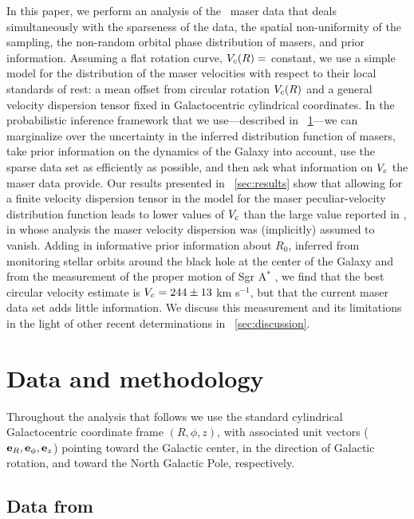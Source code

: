 In this paper, we perform an analysis of the \reid\ maser data that
deals simultaneously with the sparseness of the data, the spatial
non-uniformity of the sampling, the non-random orbital phase
distribution of masers, and prior information. Assuming a flat
rotation curve, $V_c(R) = $ constant, we use a simple model for the
distribution of the maser velocities with respect to their local
standards of rest: a mean offset from circular rotation $V_c(R)$ and a
general velocity dispersion tensor fixed in Galactocentric cylindrical
coordinates. In the probabilistic inference framework that we
use---described in \sectionname~\ref{sec:data}---we can marginalize
over the uncertainty in the inferred distribution function of masers,
take prior information on the dynamics of the Galaxy into account, use
the sparse data set as efficiently as possible, and then ask what
information on $V_c$ the maser data provide. Our results presented in
\sectionname~\ref{sec:results} show that allowing for a finite
velocity dispersion tensor in the model for the maser
peculiar-velocity distribution function leads to lower values of $V_c$
than the large value reported in \reid, in whose analysis the maser
velocity dispersion was (implicitly) assumed to vanish.  Adding in
informative prior information about $R_0$, inferred from monitoring
stellar orbits around the black hole at the center of the Galaxy
\citep{Ghez08a,Gillessen09a} and from the measurement of the proper
motion of Sgr A$^*$ \citep{Reid04a}, we find that the best circular
velocity estimate is $V_c = 244 \pm 13$ km s$^{-1}$, but that the
current maser data set adds little information. We discuss this
measurement and its limitations in the light of other recent
determinations in \sectionname~\ref{sec:discussion}.


\section{Data and methodology}\label{sec:data}

Throughout the analysis that follows we use the standard cylindrical
Galactocentric coordinate frame $(R,\phi,z)$, with associated unit
vectors ($\mathbf{e}_{R},\mathbf{e}_{\phi},\mathbf{e}_{z}$) pointing toward the Galactic center, in
the direction of Galactic rotation, and toward the North Galactic
Pole, respectively.

\subsection{Data from \protect\citet{Reid09a}}\label{sec:datasub}

